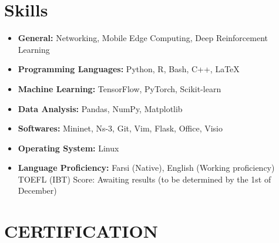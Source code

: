 \documentclass[11pt]{article}
\begin{document}
\section{Skills}



\begin{itemize}[noitemsep,topsep=0pt,parsep=0pt,partopsep=0pt]
	\item {\textbf{General:} Networking, Mobile Edge Computing, Deep Reinforcement Learning}\vspace{1mm}
	\item {\textbf{Programming Languages:} Python, R, Bash, C++, \LaTeX}\vspace{1mm}
	\item {\textbf{Machine Learning:} TensorFlow, PyTorch, Scikit-learn}\vspace{1mm}
	\item {\textbf{Data Analysis:} Pandas, NumPy, Matplotlib}\vspace{1mm}
	\item {\textbf{Softwares:} Mininet, Ns-3, Git, Vim, Flask, Office, Visio}\vspace{1mm}
	\item {\textbf{Operating System:} Linux}\vspace{1mm}
	\item {\textbf{Language Proficiency:} Farsi (Native), English (Working proficiency)}\vspace{1mm}\\
    TOEFL (IBT) Score: Awaiting results (to be determined by the 1st of December)

\end{itemize}


\section{CERTIFICATION}
\end{document}

